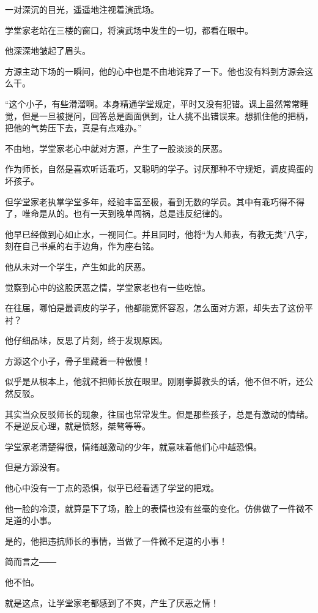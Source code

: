 
\begin{this_body}

一对深沉的目光，遥遥地注视着演武场。

学堂家老站在三楼的窗口，将演武场中发生的一切，都看在眼中。

他深深地皱起了眉头。

方源主动下场的一瞬间，他的心中也是不由地诧异了一下。他也没有料到方源会这么干。

“这个小子，有些滑溜啊。本身精通学堂规定，平时又没有犯错。课上虽然常常睡觉，但是一旦被提问，回答总是面面俱到，让人挑不出错误来。想抓住他的把柄，把他的气势压下去，真是有点难办。”

不由地，学堂家老心中就对方源，产生了一股淡淡的厌恶。

作为师长，自然是喜欢听话乖巧，又聪明的学子。讨厌那种不守规矩，调皮捣蛋的坏孩子。

但学堂家老执掌学堂多年，经验丰富至极，看到无数的学员。其中有乖巧得不得了，唯命是从的。也有一天到晚单闯祸，总是违反纪律的。

他早已经做到心如止水，一视同仁。并且同时，他将“为人师表，有教无类”八字，刻在自己书桌的右手边角，作为座右铭。

他从未对一个学生，产生如此的厌恶。

觉察到心中的这股厌恶之情，学堂家老也有一些吃惊。

在往届，哪怕是最调皮的学子，他都能宽怀容忍，怎么面对方源，却失去了这份平衬？

他仔细品味，反思了片刻，终于发现原因。

方源这个小子，骨子里藏着一种傲慢！

似乎是从根本上，他就不把师长放在眼里。刚刚拳脚教头的话，他不但不听，还公然反驳。

其实当众反驳师长的现象，往届也常常发生。但是那些孩子，总是有激动的情绪。不是逆反心理，就是愤怒，桀骜等等。

学堂家老清楚得很，情绪越激动的少年，就意味着他们心中越恐惧。

但是方源没有。

他心中没有一丁点的恐惧，似乎已经看透了学堂的把戏。

他一脸的冷漠，就算是下了场，脸上的表情也没有丝毫的变化。仿佛做了一件微不足道的小事。

是的，他把违抗师长的事情，当做了一件微不足道的小事！

简而言之――

他不怕。

就是这点，让学堂家老都感到了不爽，产生了厌恶之情！


\end{this_body}

